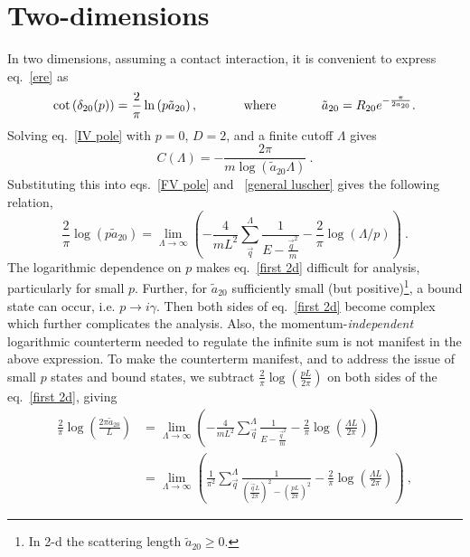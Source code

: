 \section{Two-dimensions}\label{sec:2D}

In two dimensions, assuming a contact interaction, it is convenient to express eq.~\eqref{ere} as
\begin{equation}
\cot \left(\delta_{20}(p)\right)=\frac{2}{\pi}  \ln \left(p \tilde a_{20}\right),
\hspace{0.5in}\text{where}\hspace{0.5in}
\tilde a_{20}=R_{20}e^{-\frac{\pi}{2 a_{20}}}.
\end{equation}
Solving eq.~\eqref{IV pole} with $p=0$, $D=2$, and a finite cutoff $\Lambda$ gives
\begin{equation}\label{eq:C2}
C(\Lambda)=-\frac{2 \pi}{m \log \left(\tilde a_{20} \Lambda\right)}\ .
\end{equation}
Substituting this into eqs.~\eqref{FV pole} and ~\eqref{general luscher} gives the following relation,
\begin{equation}\label{eq:first 2d}
\frac{2}{\pi} \log \left(p\tilde a_{20}\right)=\lim_{\Lambda\to\infty}\left(-\frac{4}{m L^{2}} \sum_{\vec{q}}^{\Lambda} \frac{1}{E-\frac{\vec{q}^{2}}{m}}-\frac{2}{\pi} \log (\Lambda / p)\right)\ .
\end{equation}
The logarithmic dependence on $p$ makes eq.~\eqref{first 2d} difficult for analysis, particularly for small $p$.  Further, for $\tilde a_{20}$ sufficiently small (but positive)\footnote{ In 2-d the scattering length $\tilde a_{20}\ge 0$\cite{}.}, a bound state can occur, i.e. $p\to i\gamma$.  Then both sides of eq.~\eqref{first 2d} become complex which further complicates the analysis.   Also, the momentum-\emph{independent} logarithmic counterterm needed to regulate the infinite sum is not manifest in the above expression.  To make the counterterm manifest, and to address the issue of small $p$ states and bound states, we subtract $\frac{2}{\pi}\log\left(\frac{pL}{2\pi}\right)$ on both sides of the eq.~\eqref{first 2d}, giving
\begin{align}
\frac{2}{\pi} \log \left(\frac{2\pi \tilde a_{20}}{L}\right)&=\lim_{\Lambda\to\infty}\left(-\frac{4}{m L^{2}} \sum_{\vec{q}}^{\Lambda} \frac{1}{E-\frac{\vec{q}^{2}}{m}}-\frac{2}{\pi} \log \left(\frac{\Lambda L}{2\pi}\right)\right)\nonumber\\
&=\lim_{\Lambda\to\infty}\left(\frac{1}{\pi^2} \sum_{\vec{q}}^{\Lambda} \frac{1}{\left(\frac{\vec{q}L}{2\pi}\right)^2-\left(\frac{pL}{2\pi}\right)^2}-\frac{2}{\pi} \log \left(\frac{\Lambda L}{2\pi}\right)\right)\ ,\label{eq:second 2d}
\end{align}

